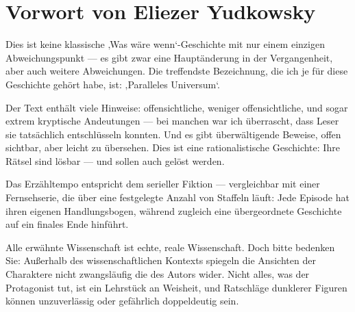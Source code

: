 \chapter*{Vorwort von Eliezer Yudkowsky}

Dies ist keine klassische ‚Was wäre wenn‘-Geschichte mit nur einem einzigen Abweichungspunkt — es gibt zwar eine Hauptänderung in der Vergangenheit, aber auch weitere Abweichungen. Die treffendste Bezeichnung, die ich je für diese Geschichte gehört habe, ist:
‚Paralleles Universum‘.

Der Text enthält viele Hinweise: offensichtliche, weniger offensichtliche, und sogar extrem kryptische Andeutungen — bei manchen war ich überrascht, dass Leser sie tatsächlich entschlüsseln konnten. Und es gibt überwältigende Beweise, offen sichtbar, aber leicht zu übersehen. Dies ist eine rationalistische Geschichte: Ihre Rätsel sind lösbar — und sollen auch gelöst werden.

Das Erzähltempo entspricht dem serieller Fiktion — vergleichbar mit einer Fernsehserie, die über eine festgelegte Anzahl von Staffeln läuft: Jede Episode hat ihren eigenen Handlungsbogen, während zugleich eine übergeordnete Geschichte auf ein finales Ende hinführt.

Alle erwähnte Wissenschaft ist echte, reale Wissenschaft. Doch bitte bedenken Sie: Außerhalb des wissenschaftlichen Kontexts spiegeln die Ansichten der Charaktere nicht zwangsläufig die des Autors wider. Nicht alles, was der Protagonist tut, ist ein Lehrstück an Weisheit, und Ratschläge dunklerer Figuren können unzuverlässig oder gefährlich doppeldeutig sein.

